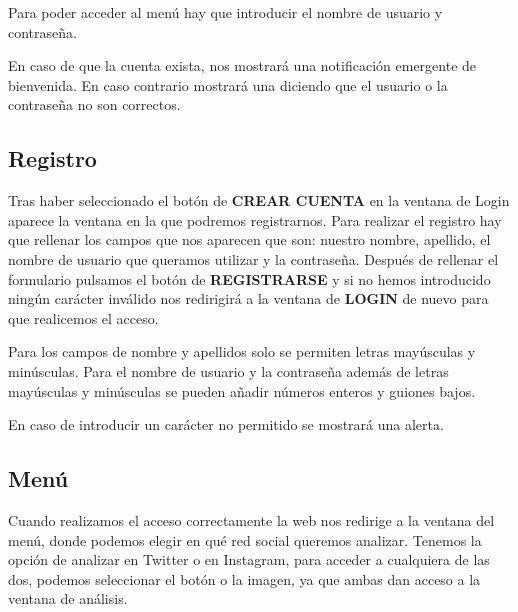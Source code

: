 Para poder acceder al menú hay que introducir el nombre de usuario y contraseña.

En caso de que la cuenta exista, nos mostrará una notificación emergente de bienvenida. En caso contrario mostrará una diciendo que el usuario o la contraseña no son correctos.




\subsection{Registro}
Tras haber seleccionado el botón de \textbf{CREAR CUENTA} en la ventana de Login aparece la ventana en la que podremos registrarnos.
Para realizar el registro hay que rellenar los campos que nos aparecen que son: nuestro nombre, apellido, el nombre de usuario que queramos utilizar y la contraseña.
Después de rellenar el formulario pulsamos el botón de \textbf{REGISTRARSE} y si no hemos introducido ningún carácter inválido nos redirigirá a la ventana de \textbf{LOGIN} de nuevo para que realicemos el acceso.


Para los campos de nombre y apellidos solo se permiten letras mayúsculas y minúsculas. Para el nombre de usuario y la contraseña además de letras mayúsculas y minúsculas se pueden añadir números enteros y guiones bajos.

En caso de introducir un carácter no permitido se mostrará una alerta.


\subsection{Menú}
Cuando realizamos el acceso correctamente la web nos redirige a la ventana del menú, donde podemos elegir en qué red social queremos analizar.
Tenemos la opción de analizar en Twitter o en Instagram, para acceder a cualquiera de las dos, podemos seleccionar el botón o la imagen, ya que ambas dan acceso a la ventana de análisis.


